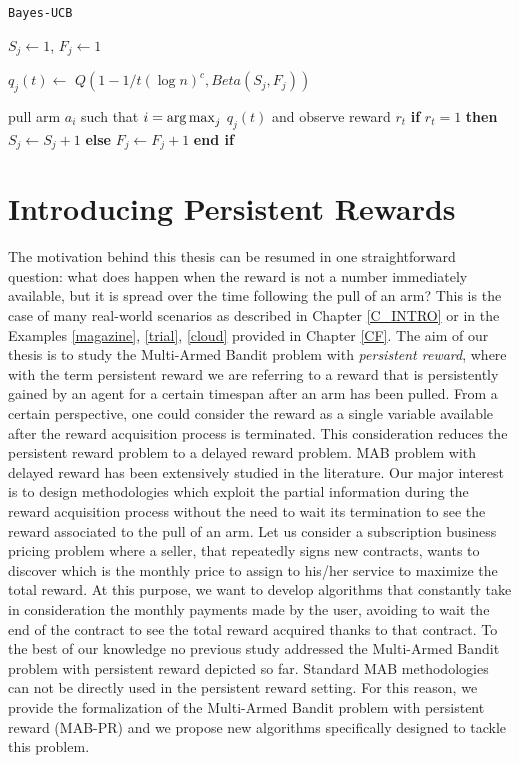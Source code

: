 \begin{algorithm}[H]
	\caption{\texttt{Bayes-UCB}}
	\begin{scriptsize}
		\begin{algorithmic}[1]						
			 
			\State $S_j \gets 1 $, $F_j \gets 1 $
			\EndFor
			 
			
			\State  $q_j(t) \gets$  $Q(1-{1}/{t(\log n)^c},Beta(S_j,F_j))$
			
			\EndFor
			\State pull arm $a_i$ such that  $i = \operatorname*{arg\,max}_j$ $q_j(t) $ and observe reward ${r_t}$	
			\State 	\textbf{if} $r_t=1$  \textbf{then} $S_j \gets S_j + 1$ \textbf{else}  $F_j \gets F_j + 1$  \textbf{end if}
			
			
			\EndFor	
		\end{algorithmic}
	\end{scriptsize}
	\label{a:BU}
\end{algorithm}


\section{Introducing Persistent Rewards}

The motivation behind this thesis can be resumed in one straightforward question: what does happen when the reward is not a number immediately available, but it is spread over the time following the pull of an arm? This is the case of many real-world scenarios as described in Chapter \ref{C_INTRO} or in the Examples \ref{magazine}, \ref{trial}, \ref{cloud} provided in Chapter \ref{CF}. The aim of our thesis is to study the  Multi-Armed Bandit problem with \emph{persistent reward}, where with the term persistent reward we are referring to a reward that is persistently gained by an agent for a certain timespan after an arm has been pulled. From a certain perspective, one could consider the reward as a single variable available after the reward acquisition process is terminated. This consideration reduces the persistent reward problem to a delayed reward problem. MAB problem with delayed reward has been extensively studied in the literature. Our major interest is to design methodologies which exploit the partial information during the reward acquisition process without the need to wait its termination to see the reward associated to the pull of an arm. Let us consider a subscription business pricing problem where a seller, that repeatedly signs new contracts, wants to discover which is the monthly price to assign to his/her service to maximize the total reward. At this purpose, we want to develop algorithms that constantly take in consideration the monthly payments made by the user, avoiding to wait the end of the contract to see the total reward acquired thanks to that contract. To the best of our knowledge no previous study addressed the Multi-Armed Bandit problem with persistent reward depicted so far. Standard MAB methodologies can not be directly used in the persistent reward setting. For this reason, we provide the formalization of the Multi-Armed Bandit problem with persistent reward (MAB-PR) and we propose new algorithms specifically designed to tackle this problem.

